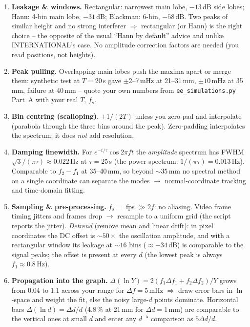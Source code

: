 \documentclass[11pt,a4paper]{article}
\newcommand{\Y}{Y}                       %
\begin{document}
\begin{enumerate}
\item \textbf{Leakage \& windows.} Rectangular: narrowest main lobe, $-13$\,dB side lobes;
Hann: 4-bin main lobe, $-31$\,dB; Blackman: 6-bin, $-58$\,dB. Two peaks of similar height
and no strong interferer $\Rightarrow$ rectangular (or Hann) is the right choice -- the
opposite of the usual ``Hann by default'' advice and unlike INTERNATIONAL's case. No amplitude
correction factors are needed (you read positions, not heights).
\item \textbf{Peak pulling.} Overlapping main lobes push the maxima apart or merge them:
synthetic test at $T=20$\,s gave $\pm2$--7\,mHz at 21--31\,mm, $\pm10$\,mHz at 35\,mm,
failure at 40\,mm -- quote your own numbers from \texttt{ee\_simulations.py} Part~A with your
real $T$, $f_s$.
\item \textbf{Bin centring (scalloping).} $\pm1/(2T)$ unless you zero-pad and interpolate
(parabola through the three bins around the peak). Zero-padding interpolates the spectrum; it
does \emph{not} add resolution.
\item \textbf{Damping linewidth.} For $e^{-t/\tau}\cos2\pi ft$ the \emph{amplitude} spectrum
has FWHM $\sqrt3/(\pi\tau)\approx0.022$\,Hz at $\tau=25$\,s (the power spectrum:
$1/(\pi\tau)=0.013$\,Hz). Comparable to $f_2-f_1$ at 35--40\,mm, so beyond $\sim35$\,mm no
spectral method on a single coordinate can separate the modes $\to$ normal-coordinate
tracking and time-domain fitting.
\item \textbf{Sampling \& pre-processing.} $f_s=$ fps $\gg2f$: no aliasing. Video frame
timing jitters and frames drop $\to$ resample to a uniform grid (the script reports the
jitter). \emph{Detrend} (remove mean and linear drift): in pixel coordinates the DC offset is
$\sim50\times$ the oscillation amplitude, and with a rectangular window its leakage at
$\sim16$ bins ($\approx-34$\,dB) is comparable to the signal peaks; the offset is present
at every $d$ (the lowest peak is always $f_1\approx0.8$\,Hz).
\item \textbf{Propagation into the graph.} $\Delta(\ln\Y)=2(f_1\Delta f_1+f_2\Delta f_2)/\Y$
grows from 0.04 to 1.1 across your range for $\Delta f=5$\,mHz $\Rightarrow$ draw error bars
in $\ln$-space and weight the fit, else the noisy large-$d$ points dominate. Horizontal bars
$\Delta(\ln d)=\Delta d/d$ (4.8\,\% at 21\,mm for $\Delta d=1$\,mm) are comparable to the
vertical ones at small $d$ and enter any $d^{-5}$ comparison as $5\Delta d/d$.
\end{enumerate}
\end{document}
